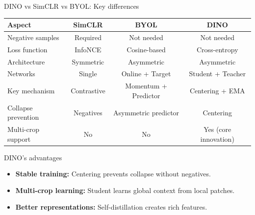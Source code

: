 \documentclass{beamer}
\begin{document}
\begin{frame}{DINO vs SimCLR vs BYOL: Key differences}
\begin{center}
{\tiny
  \begin{tabular}{|l|c|c|c|}
\hline
\textbf{Aspect} & \textbf{SimCLR} & \textbf{BYOL} & \textbf{DINO} \\
\hline
\alert{Negative samples} & Required & Not needed & Not needed \\
\hline
\alert{Loss function} & InfoNCE & Cosine-based & Cross-entropy \\
\hline
\alert{Architecture} & Symmetric & Asymmetric & Asymmetric \\
\hline
\alert{Networks} & Single & Online + Target & Student + Teacher \\
\hline
\alert{Key mechanism} & Contrastive & Momentum + Predictor & Centering + EMA \\
\hline
\alert{Collapse prevention} & Negatives & Asymmetric predictor & Centering \\
\hline
\alert{Multi-crop support} & No & No & Yes (core innovation) \\
\hline
  \end{tabular}
}
\end{center}

\vspace{0.5cm}\pause
\begin{alertblock}{\alert{DINO's advantages}}
\begin{itemize}
\item \textbf{Stable training:} Centering prevents collapse without negatives.
\vspace{0.3cm}
\item \textbf{Multi-crop learning:} Student learns global context from local patches.
\vspace{0.3cm}
\item \textbf{Better representations:} Self-distillation creates rich features.
\end{itemize}
\end{alertblock}
\end{frame}
\end{document}
